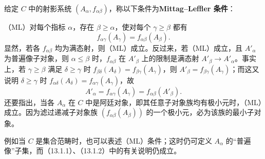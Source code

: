 给定 $C$ 中的射影系统 $(A_\alpha,f_{\alpha\beta})$，称以下条件为\textbf{Mittag--Leffler 条件}：

\noindent（ML）对每个指标 $\alpha$，存在 $\beta\geq\alpha$，使对每个 $\gamma\geq\beta$ 都有
\[
f_{\alpha\gamma}(A_\gamma)=f_{\alpha\beta}(A_\beta).
\]
显然，若各 $f_{\alpha\beta}$ 均为满态射，则（ML）成立。反过来，若（ML）成立，且 $A'_\alpha$ 为普遍像子对象，则 $\alpha\leq\beta$ 时，$f_{\alpha\beta}$ 在 $A'_\beta$ 上的限制是满态射 $A'_\beta\to A'_\alpha$。事实上，若 $\gamma\geq\beta$ 满足 $\delta\geq\gamma$ 时 $f_{\beta\delta}(A_\delta)=f_{\beta\gamma}(A_\gamma)$，则 $A'_\beta=f_{\beta\gamma}(A_\gamma)$；而这又说明 $\delta\geq\gamma$ 时 $f_{\alpha\delta}(A_\delta)=f_{\alpha\gamma}(A_\gamma)$，故
\[
A'_\alpha=f_{\alpha\gamma}(A_\gamma)=f_{\alpha\beta}(A'_\beta).
\]
还要指出，当各 $A_\alpha$ 在 $C$ 中是阿廷对象，即其任意子对象族均有极小元时，（ML）成立。因为滤过递减子对象族 $(f_{\alpha\beta}(A_\beta))$ 的一个极小元，必为该族的最小子对象。

例如当 $C$ 是集合范畴时，也可以表述（ML）条件；这时仍可定义 $A_\alpha$ 的“普遍像”子集，而（13.1.1）、（13.1.2）中的有关说明仍成立。

